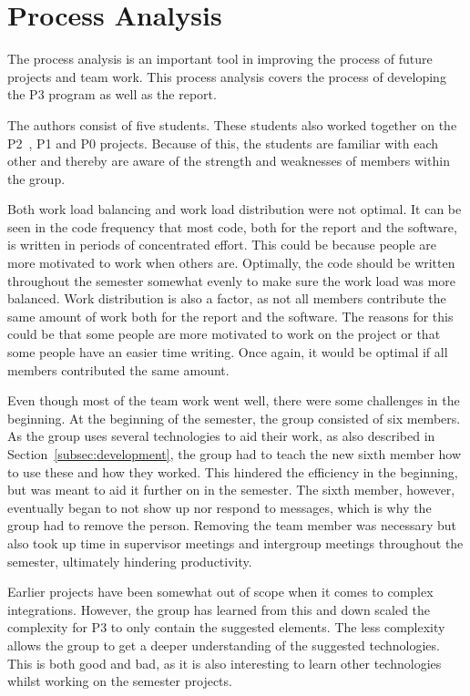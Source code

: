 \section{Process Analysis}\label{sec:process-analysis}

The process analysis is an important tool in improving the process of future projects and team work.
This process analysis covers the process of developing the P3 program as well as the report.

The authors consist of five students.
These students also worked together on the P2~\cite{P2}, P1 and P0 projects.
Because of this, the students are familiar with each other and thereby are aware of the strength and weaknesses of
members within the group.

Both work load balancing and work load distribution were not optimal.
It can be seen in the code frequency that most code, both for the report and the software, is written in periods of
concentrated effort.
This could be because people are more motivated to work when others are.
Optimally, the code should be written throughout the semester somewhat evenly to make sure the work load was more
balanced.
Work distribution is also a factor, as not all members contribute the same amount of work both for the report and the
software.
The reasons for this could be that some people are more motivated to work on the project or that some people have an
easier time writing.
Once again, it would be optimal if all members contributed the same amount.

Even though most of the team work went well, there were some challenges in the beginning.
At the beginning of the semester, the group consisted of six members.
As the group uses several technologies to aid their work, as also described in Section~\ref{subsec:development}, the
group had to teach the new sixth member how to use these and how they worked.
This hindered the efficiency in the beginning, but was meant to aid it further on in the semester.
The sixth member, however, eventually began to not show up nor respond to messages, which is why the group had to remove
the person.
Removing the team member was necessary but also took up time in supervisor meetings and intergroup meetings throughout
the semester, ultimately hindering productivity.

Earlier projects have been somewhat out of scope when it comes to complex integrations.
However, the group has learned from this and down scaled the complexity for P3 to only contain the suggested elements.
The less complexity allows the group to get a deeper understanding of the suggested technologies.
This is both good and bad, as it is also interesting to learn other technologies whilst working on the semester
projects.

